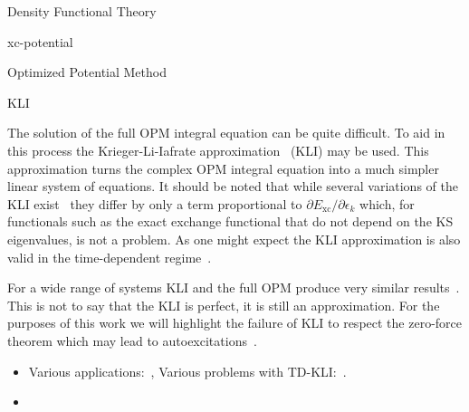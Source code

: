 \documentclass[letterpaper, 11 pt]{report}
\begin{document}
\begin{chapter}{Density Functional Theory \label{chap:dft}}
\begin{section}{xc-potential \label{sec:xcpot}}
\begin{subsection}{Optimized Potential Method \label{sec:opm}}
      \end{subsection}

      \begin{subsection}{KLI \label{sec:kli}}

         The solution of the full OPM integral equation can be quite difficult. To aid in this process
         the Krieger-Li-Iafrate approximation~\cite{kli1} (KLI) may be used. This approximation turns
         the complex OPM integral equation into a much simpler linear system of equations. It should
         be noted that while several variations of the KLI exist~\cite{kli1, kli2, kli3} they differ
         by only a term proportional to $\partial E_\mathrm{xc} / \partial \epsilon_k$ which, for
         functionals such as the exact exchange functional that do not depend on the KS eigenvalues,
         is not a problem. As one might expect the KLI approximation is also valid in the time-dependent
         regime~\cite{tdkli1, tdkli2, tdkli3}.
         
         For a wide range of systems KLI and the full OPM produce very similar results~\cite{opm-rev}.
         This is not to say that the KLI is perfect, it is still an approximation. For the purposes of 
         this work we will highlight the failure of KLI to respect the zero-force theorem which may lead
         to autoexcitations~\cite{kli-zero-force}.

      \end{subsection}

   \end{section}

   \begin{itemize}

      \item Various applications:~\cite[p. 254]{dft-engel},
         Various problems with TD-KLI:~\cite[p. 135-136]{tddft}.

      \item {\color{red}{Should I add more detail?}} %

   \end{itemize}

\end{chapter}
\end{document}
